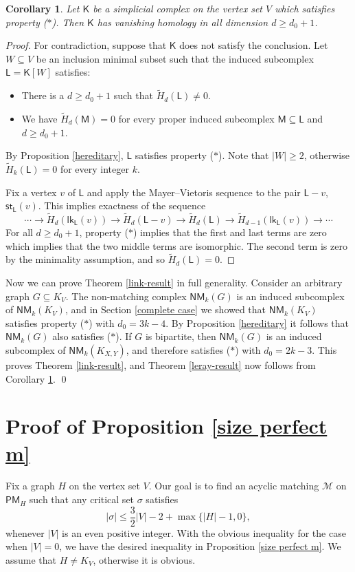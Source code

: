 \documentclass[10pt]{amsart}
\newcommand{\lk}{\mathsf{lk}}
\newcommand{\st}{\mathsf{st}}
\newtheorem{cor}[thm]{Corollary}
\theoremstyle{definition}
\begin{document}
	
	\begin{cor} \label{near d ler}
		Let $\mathsf{K}$ be a simplicial complex on the vertex set $V$ which satisfies property {\em ($\ast$)}. Then $\mathsf{K}$ has vanishing homology in all dimension $d\geq d_0+1$.
	\end{cor}
	\begin{proof}
		For contradiction, suppose that $\mathsf{K}$ does not satisfy the conclusion. Let $W\subseteq V$ be an inclusion minimal subset such that the induced subcomplex $\mathsf{L} = \mathsf{K}[W]$ satisfies:
		\begin{itemize}
			\item There is a $d \geq d_0 + 1$ such that $\tilde{H}_d (\mathsf{L}) \ne 0$.
			\item We have $\tilde{H}_d(\mathsf{M}) = 0$ for every proper induced subcomplex $\mathsf{M} \subseteq \mathsf{L}$ and $d \geq d_0 + 1$.
		\end{itemize}
		By Proposition \ref{hereditary}, $\mathsf{L}$ satisfies property ($\ast$). Note that $|W|\geq 2$, otherwise $\tilde{H}_k(\mathsf{L})=0$ for every integer $k$.
		
		Fix a vertex $v$ of $\mathsf{L}$ and apply the Mayer--Vietoris sequence to the pair $\mathsf{L} - v$,  $\st_\mathsf{L}(v)$. This implies exactness of the sequence
		\[\cdots \to \tilde{H}_d(\lk_\mathsf{L}(v)) \to
		\tilde{H}_d(\mathsf{L}-v) \to \tilde{H}_d(\mathsf{L}) \to
		\tilde{H}_{d-1}(\lk_\mathsf{L}(v)) \to \cdots \]
		For all $d\geq d_0+1$, property ($\ast$) implies that the first and last terms are zero which implies that the two middle terms are isomorphic. The second term is zero by the minimality assumption, and so  $\tilde{H}_d(\mathsf{L}) =0$.
	\end{proof}
	
	
	Now we can prove Theorem \ref{link-result} in full generality. Consider an arbitrary graph $G\subseteq K_V$. The non-matching complex $\mathsf{NM}_k(G)$ is an induced subcomplex of $\mathsf{NM}_k(K_V)$, and in Section \ref{complete case} we showed that $\mathsf{NM}_k(K_V)$ satisfies property ($\ast$) with $d_0 = 3k-4$. By Proposition \ref{hereditary} it follows that  $\mathsf{NM}_k(G)$ also satisfies ($\ast$). If $G$ is bipartite, then $\mathsf{NM}_k(G)$ is an induced subcomplex of $\mathsf{NM}_k(K_{X,Y})$, and therefore satisfies ($\ast$) with $d_0= 2k-3$.
	This proves Theorem \ref{link-result}, and Theorem \ref{leray-result} now follows from Corollary \ref{near d ler}. \qed
	
	
	\section{Proof of Proposition \ref{size perfect m}}  \label{section_size perfect m}
	Fix a graph $H$ on the vertex set $V$.
	Our goal is to find an acyclic matching $\mathcal{M}$ on $\mathsf{PM}_H$ such that any critical set $\sigma$ satisfies 
	\[|\sigma|\leq \textstyle{\frac{3}{2}}|V|-2+\max\{|H|-1,0\},\]
	whenever $|V|$ is an even positive integer. With the obvious inequality for the case when $|V|=0$, we have the desired inequality in Proposition \ref{size perfect m}. We assume that $H\neq K_V$, otherwise it is obvious.
	
\end{document}
